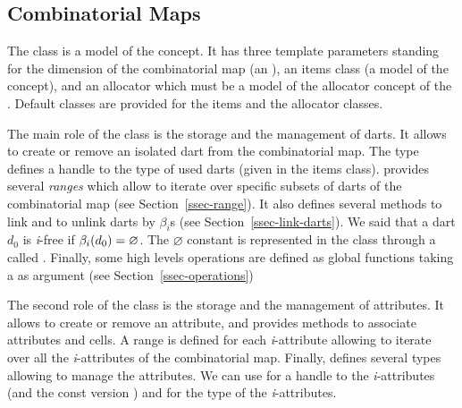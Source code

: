 \subsection{Combinatorial Maps}\label{ssec-combinatorial-map}
The class  is a model of the
 concept.  It has three template parameters
standing for the dimension of the combinatorial map (an 
), an items class (a model of the 
concept), and an allocator which must be a model of the allocator
concept of the {\stl}.  Default classes are provided for the items and
the allocator classes.

The main role of the class  is the storage and
the management of darts. It allows to create or remove an isolated
dart from the combinatorial map.  The  type defines a
handle to the type of used darts (given in the items class).
 provides several \emph{ranges} which allow to
iterate over specific subsets of darts of the combinatorial map (see
Section~\ref{ssec-range}).  It also defines several methods to link
and to unlink darts by $\beta_i$s (see
Section~\ref{ssec-link-darts}). We said that a dart $d_0$ is \emph{i}-free 
if $\beta_{i}(d_0)=\varnothing$.   The $\varnothing$ constant is
represented in the class  through a 
called \nulldart.  Finally, some high levels
operations are defined as global functions taking a
 as argument (see
Section~\ref{ssec-operations})



The second role of the class  is the storage
and the management of attributes.  It allows to create or remove an
attribute, and provides methods to associate attributes and cells.
A range is defined for each \emph{i}-attribute allowing to iterate
over all the \emph{i}-attributes of the combinatorial map.  Finally,
 defines several types allowing to manage the
attributes. We can use
 for a handle to the
\emph{i}-attributes (and the const version
) and
 for the type of the
\emph{i}-attributes.

